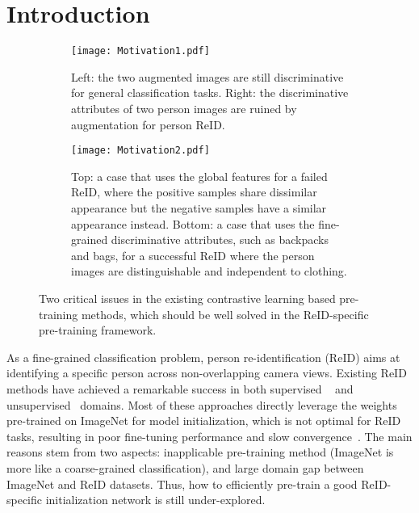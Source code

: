 \documentclass[10pt,twocolumn,letterpaper]{article}
\begin{document}
\section{Introduction}
\label{sec:intro}


\begin{figure}[ht]
	\centering
	\begin{subfigure}{.45\textwidth}
		\centering
		\texttt{[image: Motivation1.pdf]}
		\caption{Left: the two augmented images are still discriminative for general classification tasks. Right: the discriminative attributes of two person images are ruined by augmentation for person ReID.}
		\label{fig:augmentation}
	\end{subfigure}%
	\vspace{2mm}
	\begin{subfigure}{.475\textwidth}
		\centering
		\texttt{[image: Motivation2.pdf]}
		\caption{Top: a case that uses the global features for a failed ReID, where the positive samples share dissimilar appearance but the negative samples have a similar appearance instead. Bottom: a case that uses the fine-grained discriminative attributes, such as backpacks and bags, for a successful ReID where the person images are distinguishable and independent to clothing.}
		\label{fig:fine-grained}
	\end{subfigure}
	\vspace{-3mm}
	\caption{Two critical issues in the existing contrastive learning based pre-training methods, which should be well solved in the ReID-specific pre-training framework.}
	\vspace{-3mm}
\end{figure}

As a fine-grained classification problem, person re-identification (ReID) aims at identifying a specific person across non-overlapping camera views. Existing ReID methods have achieved a remarkable success in both supervised ~\cite{wang2018learning,suh2018part,shen2018person,zheng2021pose,zhang2019densely,jin2020uncertainty,jin2020semantics} and unsupervised~\cite{yang2019patch,lin2019bottom,ge2020mutual,ge2020self,jin2020style,dai2021cluster} domains. Most of these approaches directly leverage the weights pre-trained on ImageNet for model initialization, which is not optimal for ReID tasks, resulting in poor fine-tuning performance and slow convergence~\cite{wang2018learning,ge2020self}. The main reasons stem from two aspects: inapplicable pre-training method (ImageNet is more like a coarse-grained classification), and large domain gap between ImageNet and ReID datasets. Thus, how to efficiently pre-train a good ReID-specific initialization network is still under-explored.
\end{document}
